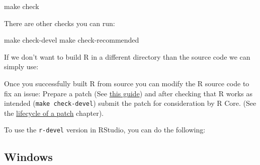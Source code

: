 \documentclass[
]{book}
\newenvironment{Shaded}{\begin{snugshade}}{\end{snugshade}}
\newcommand{\AttributeTok}[1]{\textcolor[rgb]{0.77,0.63,0.00}{#1}}
\newcommand{\BuiltInTok}[1]{#1}
\newcommand{\ExtensionTok}[1]{#1}
\newcommand{\FunctionTok}[1]{\textcolor[rgb]{0.00,0.00,0.00}{#1}}
\newcommand{\NormalTok}[1]{#1}
\newcommand{\OperatorTok}[1]{\textcolor[rgb]{0.81,0.36,0.00}{\textbf{#1}}}
\newcommand{\StringTok}[1]{\textcolor[rgb]{0.31,0.60,0.02}{#1}}
\newcommand{\VariableTok}[1]{\textcolor[rgb]{0.00,0.00,0.00}{#1}}
\begin{document}
\begin{enumerate}
\begin{Shaded}
\begin{Highlighting}[]
\FunctionTok{make}\NormalTok{ check}
\end{Highlighting}
\end{Shaded}

  There are other checks you can run:

\begin{Shaded}
\begin{Highlighting}[]
\FunctionTok{make}\NormalTok{ check{-}devel}
\FunctionTok{make}\NormalTok{ check{-}recommended}
\end{Highlighting}
\end{Shaded}
\end{enumerate}

If we don't want to build R in a different directory than the source code we can simply use:

\begin{Shaded}
\end{Shaded}

Once you successfully built R from source you can modify the R source code to fix an issue: Prepare a patch (See \href{https://www.r-project.org/bugs.html\#how-to-submit-patches}{this guide}) and after checking that R works as intended (\texttt{make\ check-devel}) submit the patch for consideration by R Core.
(See the \protect\hyperlink{FixBug}{lifecycle of a patch} chapter).

To use the \texttt{r-devel} version in RStudio, you can do the following:

\begin{Shaded}
\end{Shaded}

\hypertarget{windows}{%
\subsection{Windows}\label{windows}}
\end{document}
